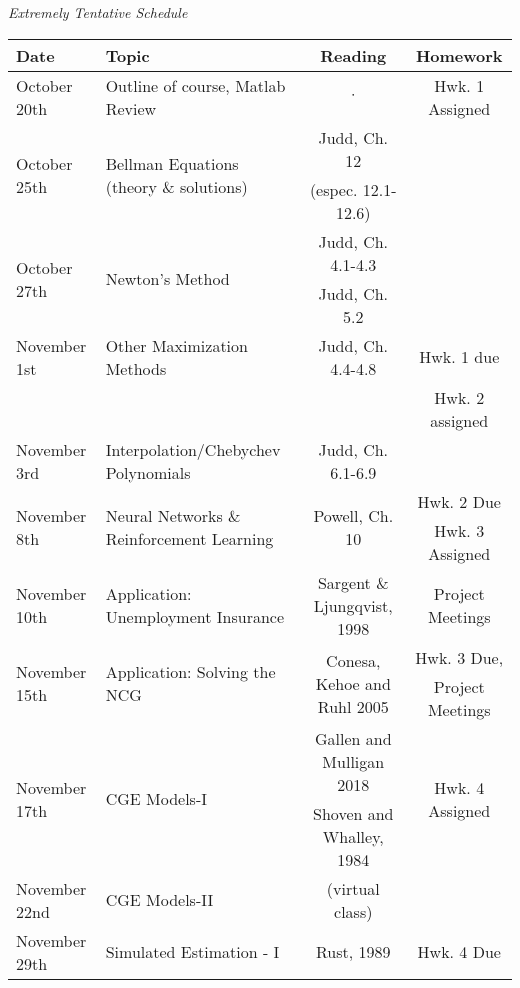 \documentclass[a4paper]{article}
\begin{document}
\emph{Extremely Tentative Schedule}
\begin{table}[ht!]
\centering
\begin{tabular}{|l|l|c|c|}
\hline
Date & Topic & Reading & Homework \\
\hline
\multirow{2}{*}{October 20th} &  \multirow{2}{*}{Outline of course, Matlab Review}  & \multirow{2}{*}{$\cdot$} & \multirow{2}{*}{Hwk. 1 Assigned} \\
 &    &  & \\
\hline
\multirow{2}{*}{October 25th} & \multirow{2}{*}{Bellman Equations (theory \& solutions)} &  Judd, Ch. 12 &  \\
 & & (espec. 12.1-12.6) & \\
\hline
\multirow{2}{*}{October 27th} & \multirow{2}{*}{Newton's Method} &  Judd, Ch. 4.1-4.3 &  \\
 &  &  Judd, Ch. 5.2 & \\
\hline
November 1st & Other Maximization Methods & Judd, Ch. 4.4-4.8  & Hwk. 1 due\\ 
 & & & Hwk. 2 assigned\\
\hline
November 3rd & Interpolation/Chebychev Polynomials & Judd, Ch. 6.1-6.9  & \\
\hline
\multirow{2}{*}{November 8th} &  \multirow{2}{*}{Neural Networks \& Reinforcement Learning} & \multirow{2}{*}{Powell, Ch. 10} & Hwk. 2 Due \\
 &     &  &  Hwk. 3 Assigned\\
\hline
\multirow{2}{*}{November 10th} & \multirow{2}{*}{Application: Unemployment Insurance} & \multirow{2}{*}{Sargent \& Ljungqvist, 1998}  & \multirow{2}{*}{Project Meetings} \\
 &  &  &  \\
\hline
\multirow{2}{*}{November 15th} & \multirow{2}{*}{Application: Solving the NCG} & \multirow{2}{*}{Conesa, Kehoe and Ruhl 2005} & Hwk. 3 Due, \\
 &  &  & Project Meetings \\
 \hline
 \multirow{2}{*}{November 17th} & \multirow{2}{*}{CGE Models-I }& Gallen and Mulligan 2018 & \multirow{2}{*}{Hwk. 4 Assigned}\\
 &  & Shoven and Whalley, 1984 & \\
 \hline
 November 22nd  & CGE Models-II & (virtual class) & \\
 \hline
 \multirow{2}{*}{November 29th} & \multirow{2}{*}{Simulated Estimation - I } & Rust, 1989 & \multirow{2}{*}{Hwk. 4 Due}\\

\end{tabular}
\end{table}
\end{document}
